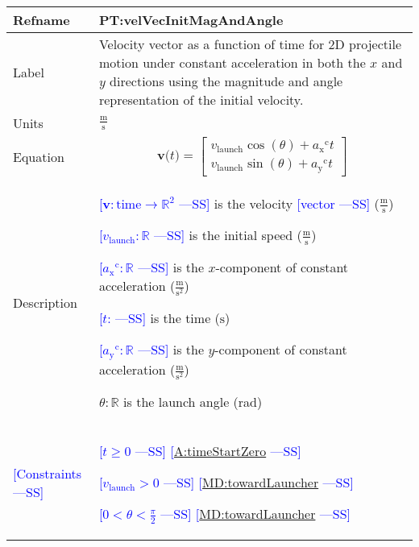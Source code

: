 \documentclass[12pt]{article}
\newcommand{\authornote}[3]{\textcolor{#1}{[#3 ---#2]}}
\newcommand{\authornote}[3]{}
\newcommand{\wss}[1]{\authornote{blue}{SS}{#1}}
\begin{document}
\noindent
\begin{minipage}{\textwidth}
\begin{tabular}{>{\raggedright}p{}>{\raggedright\arraybackslash}p{}}
\toprule \textbf{Refname} & \textbf{PT:velVecInitMagAndAngle}
\label{PT:velVecInitMagAndAngle}
\\ \midrule
Label & Velocity vector as a function of time for 2D projectile motion under
constant acceleration in both the $x$ and $y$ directions using the magnitude and
angle representation of the initial velocity.
        
\\ \midrule
Units & $\frac{\text{m}}{\text{s}}$
        
\\ \midrule
Equation & \begin{displaymath}
           \symbf{v}\text{(}t\text{)}=\begin{bmatrix}
                                      {{v}_{\text{launch}}} \cos(\theta)+{{a_{\text{x}}}^{\text{c}}} t\\
                                      {{v}_{\text{launch}}} \sin(\theta)+{{a_{\text{y}}}^{\text{c}}} t
                                      \end{bmatrix}
           \end{displaymath}
\\ \midrule
Description & \begin{symbDescription}
              \item{\wss{$\symbf{v}: \text{time} \rightarrow \mathbb{R}^2$} is the velocity \wss{vector} ($\frac{\text{m}}{\text{s}}$)}
              \item{\wss{${{v}_{\text{launch}}}: \mathbb{R}$} is the initial speed ($\frac{\text{m}}{\text{s}}$)}
              \item{\wss{${{a_{\text{x}}}^{\text{c}}}: \mathbb{R}$} is the $x$-component of constant acceleration ($\frac{\text{m}}{\text{s}^{2}}$)}
              \item{\wss{$t$: \text{time}} is the time (${\text{s}}$)}
              \item{\wss{${{a_{\text{y}}}^{\text{c}}}: \mathbb{R}$} is the $y$-component of constant acceleration ($\frac{\text{m}}{\text{s}^{2}}$)}
              \item $\theta: \mathbb{R}$ is the launch angle (rad)
              \end{symbDescription}

\\ \midrule
\wss{Constraints} & 
\begin{symbDescription}
\item \wss{$t \geq 0$} \wss{\hyperref[timeStartZero]{A:timeStartZero}}
\item \wss{$v_\text{launch} > 0$} \wss{\hyperref[MD:towardLauncher]{MD:towardLauncher}}
\item \wss{$
0 < \theta < \frac{\pi}{2}$} \wss{\hyperref[MD:towardLauncher]{MD:towardLauncher}}
\end{symbDescription}


\end{tabular}
\end{minipage}
\end{document}
